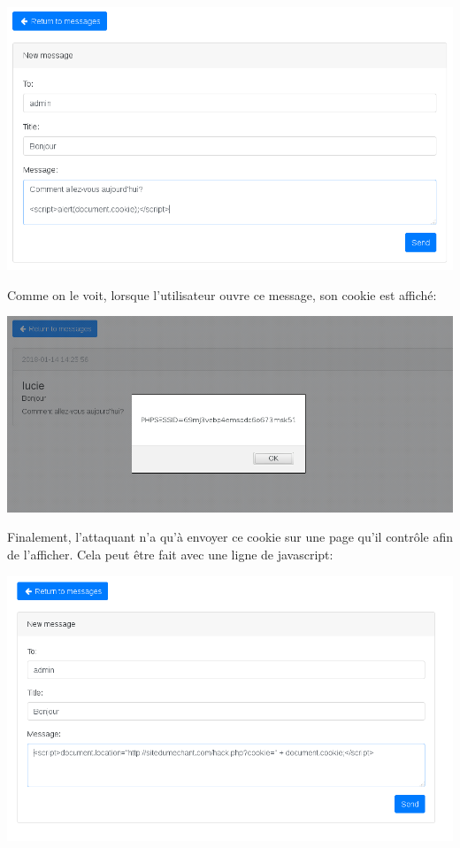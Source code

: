 \documentclass{article}
\begin{document}
\includegraphics{images/xss3.png}

Comme on le voit, lorsque l'utilisateur ouvre ce message, son cookie est
affiché:

\includegraphics{images/xss4.png}

Finalement, l'attaquant n'a qu'à envoyer ce cookie sur une page qu'il
contrôle afin de l'afficher. Cela peut être fait avec une ligne de
javascript:

\includegraphics{images/xss5.png}
\end{document}
